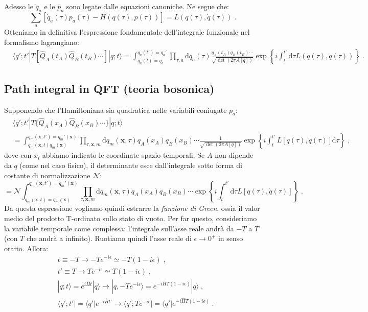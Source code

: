 \documentclass[12pt,a4paper]{article}
\theoremstyle{definition}
\newcommand{\diff}[1][]{\mathrm{d}#1}
\newcommand{\bra}{\langle}
\newcommand{\ket}{\rangle}
\numberwithin{equation}{section}
\begin{document}
Adesso le $\dot{q}_a$ e le $\overline{p}_a$ sono legate dalle equazioni canoniche. Ne segue che:
\begin{equation}
\sum_a[\dot{q}_a(\tau)p_a(\tau)-H(q(\tau),p(\tau))]=L(q(\tau),\dot{q}(\tau))\;.
\end{equation}
Otteniamo in definitiva l'espressione fondamentale dell'integrale funzionale nel formalismo lagrangiano:
\begin{align}
&\bra q';t'|T[\hat{Q}_A(t_A)\hat{Q}_B(t_B)\cdots]|q;t\ket = \int_{q_a(t)=q_a}^{q_a(t')=q_a'}\prod_{\tau,a}\diff{q}_a(\tau)\frac{q_A(t_A)q_B(t_B)\cdots}{\sqrt{\det(2\pi A[q])}}\exp\left\{i\int_t^{t'}\diff{\tau}L(q(\tau),\dot{q}(\tau))\right\}\;.
\end{align}
\subsection{Path integral in QFT (teoria bosonica)}
Supponendo che l'Hamiltoniana sia quadratica nelle variabili coniugate $p_a$:
\begin{align*}
&\bra q';t'|T\{\hat{Q}_A(x_A)\hat{Q}_B(x_B)\cdots\}|q;t\ket\\
&= \int_{q_m(\mathbf{x},t)q_m(\mathbf{x})}^{q_m(\mathbf{x},t')=q_m'(\mathbf{x})}\prod_{\tau,\mathbf{x},m}\diff{q}_m(\mathbf{x},\tau)q_A(x_A)q_B(x_B)\cdots\frac{1}{\sqrt{\det(2\pi A[q])}}\exp\left\{i\int_t^{t'}L[q(\tau),\dot{q}(\tau)]\diff{\tau}\right\}\;,
\end{align*}
dove con $x_i$ abbiamo indicato le coordinate spazio-temporali. Se $A$ non dipende da $q$ (come nel caso fisico), il determinante esce dall'integrale sotto forma di costante di normalizzazione $\mathcal{N}$:
$$
=\mathcal{N}\int_{q_m(\mathbf{x},t)=q_m(\mathbf{x})}^{q_m(\mathbf{x},t')=q_m'(\mathbf{x})}\prod_{\tau,\mathbf{x},m}\diff{q}_m(\mathbf{x},\tau)q_A(x_A)q_B(x_B)\cdots \exp\left\{i\int_t^{t'}\diff{\tau}L[q(\tau),\dot{q}(\tau)]\right\}\;.
$$
Da questa espressione vogliamo quindi estrarre la \emph{funzione di Green}, ossia il valor medio del prodotto T-ordinato sullo stato di vuoto. Per far questo, consideriamo la variabile temporale come complessa: l'integrale sull'asse reale andrà da $-T$ a $T$ (con $T$ che andrà a infinito). Ruotiamo quindi l'asse reale di $\epsilon\to 0^+$ in senso orario. Allora:
\begin{align*}
&t\equiv -T\to -Te^{-i\epsilon}\simeq -T(1-i\epsilon)\;, \\
&t'\equiv T\to Te^{-i\epsilon}\simeq T(1-i\epsilon)\;, \\
&|q;t\ket=e^{i\hat{H}t}|q\ket\to |q,-Te^{-i\epsilon}\ket=e^{-i\hat{H}T(1-i\epsilon)}|q\ket\;, \\
&\bra q';t'|=\bra q'|e^{-i\hat{H}t'}\to \bra q';Te^{-i\epsilon}|=\bra q'|e^{-i\hat{H}T(1-i\epsilon)}\;.
\end{align*}
\end{document}
